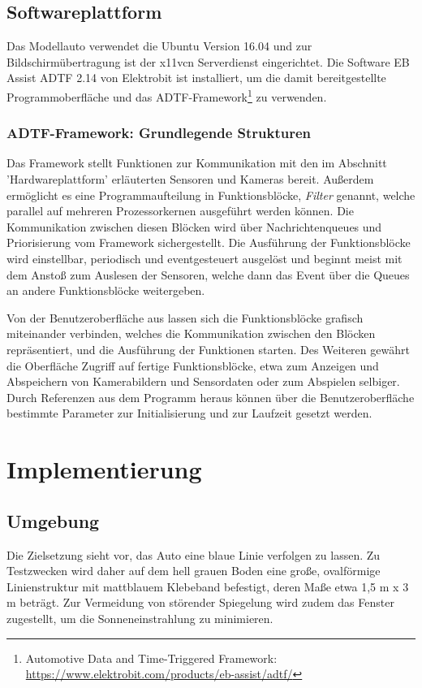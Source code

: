 \documentclass[12pt, a4paper]{scrartcl}
\begin{document}
\subsection{Softwareplattform}
Das Modellauto verwendet die Ubuntu Version 16.04 und zur Bildschirmübertragung ist der x11vcn Serverdienst eingerichtet. Die Software EB Assist ADTF 2.14 von Elektrobit ist installiert, um die damit bereitgestellte Programmoberfläche und das ADTF-Framework\footnote{Automotive Data and Time-Triggered Framework: \url{https://www.elektrobit.com/products/eb-assist/adtf/}} zu verwenden.

\subsubsection{ADTF-Framework: Grundlegende Strukturen}
 Das Framework stellt Funktionen zur Kommunikation mit den im Abschnitt 'Hardwareplattform' erläuterten Sensoren und Kameras bereit. Außerdem ermöglicht es eine Programmaufteilung in Funktionsblöcke, \emph{Filter} genannt, welche parallel auf mehreren Prozessorkernen ausgeführt werden können. Die Kommunikation zwischen diesen Blöcken wird über Nachrichtenqueues und Priorisierung vom Framework sichergestellt. Die Ausführung der Funktionsblöcke wird einstellbar, periodisch und eventgesteuert ausgelöst und beginnt meist mit dem Anstoß zum Auslesen der Sensoren, welche dann das Event über die Queues an andere Funktionsblöcke weitergeben.

Von der Benutzeroberfläche aus lassen sich die Funktionsblöcke grafisch miteinander verbinden, welches die Kommunikation zwischen den Blöcken repräsentiert, und die Ausführung der Funktionen starten. Des Weiteren gewährt die Oberfläche Zugriff auf fertige Funktionsblöcke, etwa zum Anzeigen und Abspeichern von Kamerabildern und Sensordaten oder zum  Abspielen selbiger.
Durch Referenzen aus dem Programm heraus können über die Benutzeroberfläche bestimmte Parameter zur Initialisierung und zur Laufzeit gesetzt werden.


\newpage
\section{Implementierung}

\subsection{Umgebung}

Die Zielsetzung sieht vor, das Auto eine blaue Linie verfolgen zu lassen. Zu Testzwecken wird daher auf dem hell grauen Boden eine große, ovalförmige Linienstruktur mit mattblauem Klebeband befestigt, deren Maße etwa 1,5 m x 3 m beträgt. Zur Vermeidung von störender Spiegelung wird zudem das Fenster zugestellt, um die Sonneneinstrahlung zu minimieren.
\end{document}
